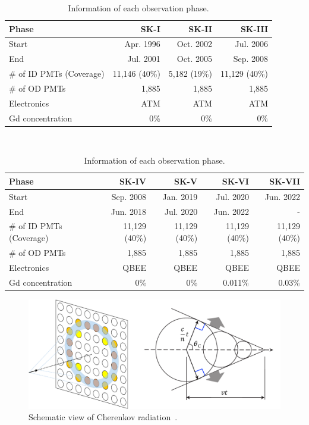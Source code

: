 \begin{table}[h]
	\caption[Information of each observation phase]{\label{002_Tab:phase} Information of each observation phase.}
	\centering
	\vs
	\begin{tabular}{lrrr}
		\hline\hline
		Phase&SK-I&SK-II&SK-III\\
		\hline
		Start&Apr. 1996&Oct. 2002&Jul. 2006\\
		End&Jul. 2001&Oct. 2005&Sep. 2008\\
		\# of ID PMTs (Coverage)&11,146 (40\%)&5,182 (19\%)&11,129 (40\%)\\
		\# of OD PMTs&1,885&1,885&1,885\\
		Electronics&ATM&ATM&ATM\\
		Gd concentration&0\%&0\%&0\%\\
		\hline\hline
	\end{tabular}
	\\
	\vs
	\begin{tabular}{lrrrr}
		\hline\hline
		Phase&SK-IV&SK-V&SK-VI&SK-VII\\
		\hline
		Start&Sep. 2008&Jan. 2019&Jul. 2020&Jun. 2022\\
		End&Jun. 2018&Jul. 2020&Jun. 2022&-\\
		\# of ID PMTs (Coverage)&11,129 (40\%)&11,129 (40\%)&11,129 (40\%)&11,129 (40\%)\\
		\# of OD PMTs&1,885&1,885&1,885&1,885\\
		Electronics&QBEE&QBEE&QBEE&QBEE\\
		Gd concentration&0\%&0\%&0.011\%&0.03\%\\
		\hline\hline
	\end{tabular}
\end{table}

\begin{figure}[tbp]
	\centering
	\includegraphics[width=15cm]{Figures/002/F12_Cherenkov}
	\caption[Schematic view of Cherenkov radiation]{\label{002_F12_Cherenkov} Schematic view of Cherenkov radiation~\cite{2015Yamamoto}.}
\end{figure}

